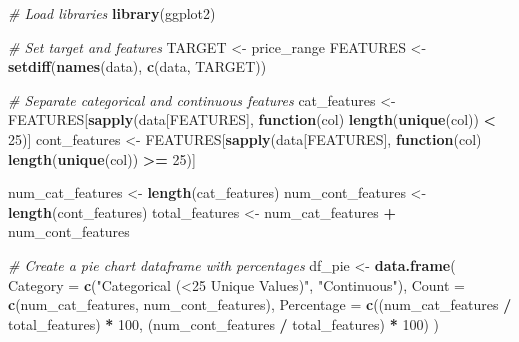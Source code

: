 \documentclass[
]{article}
\newenvironment{Shaded}{\begin{snugshade}}{\end{snugshade}}
\newcommand{\AttributeTok}[1]{\textcolor[rgb]{0.13,0.29,0.53}{#1}}
\newcommand{\CommentTok}[1]{\textcolor[rgb]{0.56,0.35,0.01}{\textit{#1}}}
\newcommand{\ControlFlowTok}[1]{\textcolor[rgb]{0.13,0.29,0.53}{\textbf{#1}}}
\newcommand{\DecValTok}[1]{\textcolor[rgb]{0.00,0.00,0.81}{#1}}
\newcommand{\FunctionTok}[1]{\textcolor[rgb]{0.13,0.29,0.53}{\textbf{#1}}}
\newcommand{\NormalTok}[1]{#1}
\newcommand{\OtherTok}[1]{\textcolor[rgb]{0.56,0.35,0.01}{#1}}
\newcommand{\SpecialCharTok}[1]{\textcolor[rgb]{0.81,0.36,0.00}{\textbf{#1}}}
\newcommand{\StringTok}[1]{\textcolor[rgb]{0.31,0.60,0.02}{#1}}
\begin{document}
\begin{Shaded}
\begin{Highlighting}[]
\CommentTok{\# Load libraries}
\FunctionTok{library}\NormalTok{(ggplot2)}

\CommentTok{\# Set target and features}
\NormalTok{TARGET }\OtherTok{\textless{}{-}} \StringTok{\textquotesingle{}price\_range\textquotesingle{}}
\NormalTok{FEATURES }\OtherTok{\textless{}{-}} \FunctionTok{setdiff}\NormalTok{(}\FunctionTok{names}\NormalTok{(data), }\FunctionTok{c}\NormalTok{(}\StringTok{\textquotesingle{}data\textquotesingle{}}\NormalTok{, TARGET))}

\CommentTok{\# Separate categorical and continuous features}
\NormalTok{cat\_features }\OtherTok{\textless{}{-}}\NormalTok{ FEATURES[}\FunctionTok{sapply}\NormalTok{(data[FEATURES], }\ControlFlowTok{function}\NormalTok{(col) }\FunctionTok{length}\NormalTok{(}\FunctionTok{unique}\NormalTok{(col)) }\SpecialCharTok{\textless{}} \DecValTok{25}\NormalTok{)]}
\NormalTok{cont\_features }\OtherTok{\textless{}{-}}\NormalTok{ FEATURES[}\FunctionTok{sapply}\NormalTok{(data[FEATURES], }\ControlFlowTok{function}\NormalTok{(col) }\FunctionTok{length}\NormalTok{(}\FunctionTok{unique}\NormalTok{(col)) }\SpecialCharTok{\textgreater{}=} \DecValTok{25}\NormalTok{)]}

\NormalTok{num\_cat\_features }\OtherTok{\textless{}{-}} \FunctionTok{length}\NormalTok{(cat\_features)}
\NormalTok{num\_cont\_features }\OtherTok{\textless{}{-}} \FunctionTok{length}\NormalTok{(cont\_features)}
\NormalTok{total\_features }\OtherTok{\textless{}{-}}\NormalTok{ num\_cat\_features }\SpecialCharTok{+}\NormalTok{ num\_cont\_features}

\CommentTok{\# Create a pie chart dataframe with percentages}
\NormalTok{df\_pie }\OtherTok{\textless{}{-}} \FunctionTok{data.frame}\NormalTok{(}
  \AttributeTok{Category =} \FunctionTok{c}\NormalTok{(}\StringTok{"Categorical (\textless{}25 Unique Values)"}\NormalTok{, }\StringTok{"Continuous"}\NormalTok{),}
  \AttributeTok{Count =} \FunctionTok{c}\NormalTok{(num\_cat\_features, num\_cont\_features),}
  \AttributeTok{Percentage =} \FunctionTok{c}\NormalTok{((num\_cat\_features }\SpecialCharTok{/}\NormalTok{ total\_features) }\SpecialCharTok{*} \DecValTok{100}\NormalTok{, (num\_cont\_features }\SpecialCharTok{/}\NormalTok{ total\_features) }\SpecialCharTok{*} \DecValTok{100}\NormalTok{)}
\NormalTok{)}


\end{Highlighting}
\end{Shaded}
\end{document}
